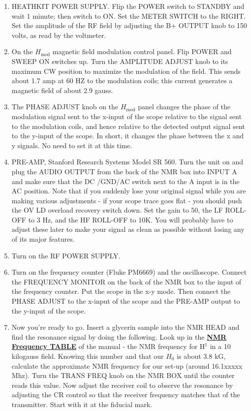 \documentclass{../lab}
\begin{document}
\begin{enumerate}
    \item HEATHKIT POWER SUPPLY. Flip the POWER switch to STANDBY and wait 1 minute; then switch to ON. Set the METER SWITCH to the RIGHT. Set the amplitude of the RF field by adjusting the B+ OUTPUT knob to 150 volts, as read by the voltmeter.

    \item On the $H_\text{mod}$ magnetic field modulation control panel. Flip POWER and SWEEP ON switches up. Turn the AMPLITUDE ADJUST knob to its maximum CW position to maximize the modulation of the field. This sends about 1.7 amp at 60 HZ to the modulation coils; this current generates a magnetic field of about 2.9 gauss.

    \item The PHASE ADJUST knob on the $H_\text{mod}$ panel changes the phase of the modulation signal sent to the x-input of the scope relative to the signal sent to the modulation coils, and hence relative to the detected output signal sent to the y-input of the scope. In short, it changes the phase between the x and y signals. No need to set it at this time.

    \item PRE-AMP, Stanford Research Systems Model SR 560. Turn the unit on and plug the AUDIO OUTPUT from the back of the NMR box into INPUT A and make sure that the DC /GND/AC switch next to the A input is in the AC position. Note that if you suddenly lose your original signal while you are making various adjustments - if your scope trace goes flat - you should push the OV LD overload recovery switch down. Set the gain to 50, the LF ROLL-OFF to 3 Hz, and the HF ROLL-OFF to 10K. You will probably have to adjust these later to make your signal as clean as possible without losing any of its major features.

    \item Turn on the RF POWER SUPPLY.

    \item Turn on the frequency counter (Fluke PM6669) and the oscilloscope. Connect the FREQUENCY MONITOR on the back of the NMR box to the input of the frequency counter. Put the scope in the x-y mode. Then connect the PHASE ADJUST to the x-input of the scope and the PRE-AMP output to the y-input of the scope.

    \item Now you're ready to go. Insert a glycerin sample into the NMR HEAD and find the resonance signal by doing the following. Look up in the \href{http://experimentationlab.berkeley.edu/sites/default/files/images/NMR32.jpg}{\textbf{NMR Frequency TABLE}} of the manual - the NMR frequency for H$^1$ in a 10 kilogauss field. Knowing this number and that our $H_0$ is about 3.8 kG, calculate the approximate NMR frequency for our set-up (around 16.1xxxxx Mhz). Turn the TRANS FREQ knob on the NMR BOX until the counter reads this value. Now adjust the receiver coil to observe the resonance by adjusting the CR control so that the receiver frequency matches that of the transmitter. Start with it at the fiducial mark.


\end{enumerate}
\end{document}
